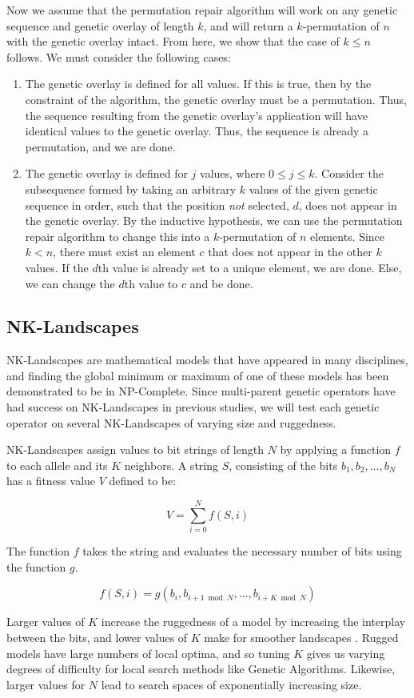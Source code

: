 Now we assume that the permutation repair algorithm will work on any genetic sequence and genetic overlay of length $k$, and will return a $k$-permutation of $n$ with the genetic overlay intact. From here, we show that the case of $k \leq n$ follows. We must consider the following cases:
\begin{enumerate}
\item The genetic overlay is defined for all values. 
If this is true, then by the constraint of the algorithm, the genetic overlay must be a permutation. Thus, the sequence resulting from the genetic overlay's application will have identical values to the genetic overlay. Thus, the sequence is already a permutation, and we are done.

\item The genetic overlay is defined for $j$ values, where $0 \leq j \leq k $. 
Consider the subsequence formed by taking an arbitrary $k$ values of the given genetic sequence in order, such that the position \emph{not} selected, $d$, does not appear in the genetic overlay. By the inductive hypothesis, we can use the permutation repair algorithm to change this into a $k$-permutation of $n$ elements. Since $k < n$, there must exist an element $c$ that does not appear in the other $k$ values. If the $d$th value is already set to a unique element, we are done. Else, we can change the $d$th value to $c$ and be done.
\end{enumerate}

%
%

\subsection*{NK-Landscapes}

NK-Landscapes are mathematical models that have appeared in many disciplines, and finding the global minimum or maximum of one of these models has been demonstrated to be in NP-Complete\cite{Weinberger96}. Since multi-parent genetic operators have had success on NK-Landscapes in previous studies, we will test each genetic operator on several NK-Landscapes of varying size and ruggedness\cite{Eiben96,Skellett05}. 

NK-Landscapes assign values to bit strings of length $N$ by applying a function $f$ to each allele and its $K$ neighbors\cite{Kauffman93}. A string $S$, consisting of the bits $b_1,b_2,\ldots,b_N$ has a fitness value $V$ defined to be:

\[ V = \sum\limits_{i = 0}^{N} f(S,i) \]

The function $f$ takes the string and evaluates the necessary number of bits using the function $g$.

\[ f(S,i) = g(b_i, b_{i+1 \bmod{N}}, \ldots, b_{i+K \bmod{N}}) \]

Larger values of $K$ increase the ruggedness of a model by increasing the interplay between the bits, and lower values of $K$ make for smoother landscapes \cite{Kauffman93}. Rugged models have large numbers of local optima, and so tuning $K$ gives us varying degrees of difficulty for local search methods like Genetic Algorithms\cite{Russell10,Skellett05}. Likewise, larger values for $N$ lead to search spaces of exponentially increasing size. 